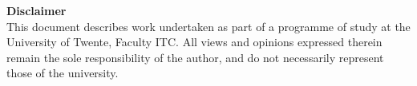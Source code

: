 \documentclass[10pt, a4paper]{article}
\begin{document}
\pagebreak

\begin{abstract}
\end{abstract}

\pagebreak
\textbf{Disclaimer}\\

This document describes work undertaken as part of a programme of study at the University of
Twente, Faculty ITC. All views and opinions expressed therein remain the sole responsibility of
the author, and do not necessarily represent those of the university.\\

\pagebreak

\section*{}
\tableofcontents 

\vspace{4em}
\end{document}
